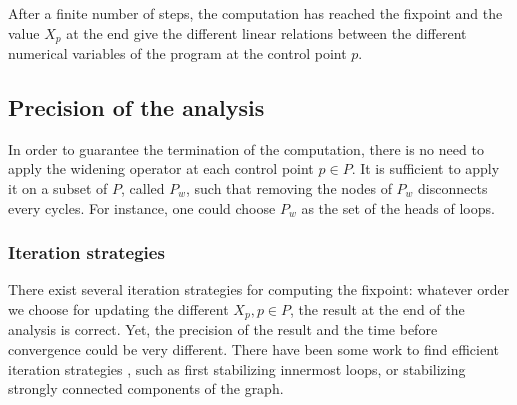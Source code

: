 \documentclass[a4paper,english,titlepage,11pt]{report}
\begin{document}
After a finite number of steps, the computation has reached the fixpoint and the
value $X_p$ at the end give the different linear relations between the
different numerical variables of the program at the control point $p$.

\subsection{Precision of the analysis}
In order to guarantee the termination of the computation, there is no need to
apply the widening operator at each control point $p \in P$. It is sufficient to
apply it on a subset of $P$, called $P_w$, such that removing the nodes of $P_w$
disconnects every cycles. For instance, one could choose $P_w$ as the set of the
heads of loops.

\subsubsection{Iteration strategies}
There exist several iteration strategies for computing the fixpoint: whatever
order we choose for updating the different $X_p, p\in P$, the result at the
end of the analysis is correct. Yet, the precision of the result and the time
before convergence could be very different. 
There have been some work to find efficient iteration strategies
\cite{Bou92}, such as first stabilizing innermost loops, or stabilizing strongly
connected components of the graph.
\end{document}
